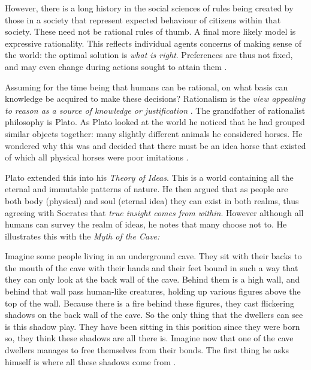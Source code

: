 However, there is a long history in the social sciences of rules being created by those in a society that represent expected behaviour of citizens within that society. These need not be rational rules of thumb. A final more likely model is expressive rationality. This reflects individual agents concerns of making sense of the world: the optimal solution is \textit{what is right}. Preferences are thus not fixed, and may even change during actions sought to attain them \cite{Hargreaves:1989}.

Assuming for the time being that humans can be rational, on what basis can knowledge be acquired to make these decisions? Rationalism is the \textit{view appealing to reason as a source of knowledge or justification} \cite{Lacey:1976}. The grandfather of rationalist philosophy is Plato. As Plato looked at the world he noticed that he had grouped similar objects together: many slightly different animals he considered horses. He wondered why this was and decided that there must be an idea horse that existed of which all physical horses were poor imitations \cite{Gardner:1995}.

Plato extended this into his \textit{Theory of Ideas}. This is a world containing all the eternal and immutable patterns of nature. He then argued that as people are both body (physical) and soul (eternal idea) they can exist in both realms, thus agreeing with Socrates that \textit{true insight comes from within}. However although all humans can survey the realm of ideas, he notes that many choose not to. He illustrates this with the \textit{Myth of the Cave:}

\begin{displayquote}
Imagine some people living in an underground cave. They sit with their backs to the mouth of the cave with their hands and their feet bound in such a way that they can only look at the back wall of the cave. Behind them is a high wall, and behind that wall pass human-like creatures, holding up various figures above the top of the wall. Because there is a fire behind these figures, they cast flickering shadows on the back wall of the cave. So the only thing that the dwellers can see is this shadow play. They have been sitting in this position since they were born so, they think these shadows are all there is. Imagine now that one of the cave dwellers manages to free themselves from their bonds. The first thing he asks himself is where all these shadows come from \cite{Plato:1901}.
\end{displayquote}


